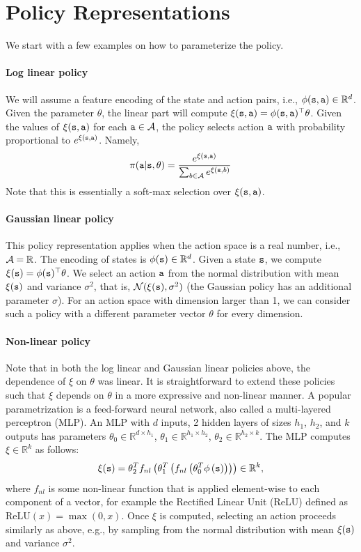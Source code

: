 \section{Policy Representations}
We start with a few examples on how to parameterize the policy.
\paragraph{Log linear policy} We will assume a feature encoding
of the state and action pairs, i.e., $\phi({\tt s},{\tt a})\in \mathbb{R}^{d}$. Given the parameter $\theta$, the linear part will compute $\xi({\tt s},{\tt a})=\phi({\tt s},{\tt a})^\top \theta$. Given the values of $\xi({\tt s},{\tt a})$ for each ${\tt a}\in \mathcal{A}$, the policy selects action ${\tt a}$ with probability proportional to
$e^{\xi({\tt s},{\tt a})}$. Namely,
\[
\pi({\tt a}|{\tt s},\theta)=
\frac{e^{\xi({\tt s},{\tt a})}}{\sum_{b\in
\mathcal{A}}e^{\xi({\tt s},b)}}
\]
Note that this is essentially a soft-max selection over $\xi({\tt s},{\tt a})$.

\paragraph{Gaussian linear policy} This policy representation applies when the action
space is a real number, i.e., $\mathcal{A}=\mathbb{R}$. The encoding of states is $\phi({\tt s})\in \mathbb{R}^{d}$. Given a state ${\tt s}$,
we compute $\xi({\tt s})=\phi({\tt s})^\top\theta$. We select an
action ${\tt a}$ from the normal distribution with mean
$\xi({\tt s})$ and variance $\sigma^2$, that is, $\mathcal{N}(\xi({\tt s}),\sigma^2)$ (the Gaussian policy has an additional parameter $\sigma$). For an action space with dimension larger than 1, we can consider such a policy with a different parameter vector $\theta$ for every dimension.

\paragraph{Non-linear policy} Note that in both the log linear and Gaussian linear policies above, the dependence of $\xi$ on $\theta$ was linear. It is straightforward to extend these policies such that $\xi$ depends on $\theta$ in a more expressive and non-linear manner. A popular parametrization is a feed-forward neural network, also called a multi-layered perceptron (MLP). An MLP with $d$ inputs, 2 hidden layers of sizes $h_1$, $h_2$, and $k$ outputs has parameters $\theta_0 \in \mathbb{R}^{d \times h_1}$, $\theta_1 \in \mathbb{R}^{h_1 \times h_2}$, $\theta_2 \in \mathbb{R}^{h_2 \times k}$. The MLP computes $\xi\in \mathbb{R}^{k}$ as follows:
\begin{equation*}
    \xi({\tt s}) = \theta_2^T f_{nl}\left(\theta_1^T\left( f_{nl}\left(\theta_0^T \phi\left({\tt s} \right)\right)\right)\right) \in \mathbb{R}^{k},
\end{equation*}
where $f_{nl}$ is some non-linear function that is applied element-wise to each component of a vector, for example the Rectified Linear Unit (ReLU) defined as $\text{ReLU}(x) = \max(0, x)$. Once $\xi$ is computed, selecting an
action proceeds similarly as above, e.g., by sampling from the normal distribution with mean
$\xi({\tt s})$ and variance $\sigma^2$.

